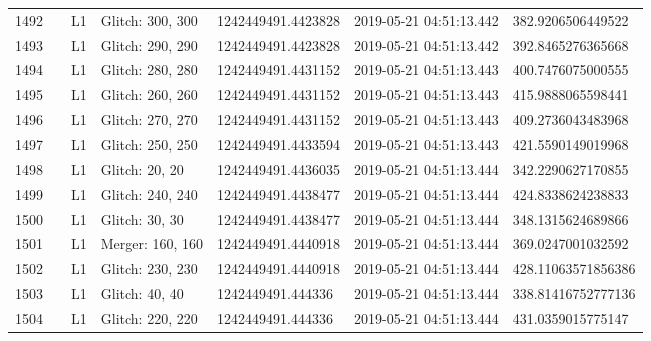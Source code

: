 \begin{longtable}{lllllll}
1492 &                                                    &       L1 &  Glitch: 300, 300 &  1242449491.4423828 &  2019-05-21 04:51:13.442 &   382.9206506449522 \\
1493 &                                                    &       L1 &  Glitch: 290, 290 &  1242449491.4423828 &  2019-05-21 04:51:13.442 &   392.8465276365668 \\
1494 &                                                    &       L1 &  Glitch: 280, 280 &  1242449491.4431152 &  2019-05-21 04:51:13.443 &   400.7476075000555 \\
1495 &                                                    &       L1 &  Glitch: 260, 260 &  1242449491.4431152 &  2019-05-21 04:51:13.443 &   415.9888065598441 \\
1496 &                                                    &       L1 &  Glitch: 270, 270 &  1242449491.4431152 &  2019-05-21 04:51:13.443 &   409.2736043483968 \\
1497 &                                                    &       L1 &  Glitch: 250, 250 &  1242449491.4433594 &  2019-05-21 04:51:13.443 &   421.5590149019968 \\
1498 &                                                    &       L1 &    Glitch: 20, 20 &  1242449491.4436035 &  2019-05-21 04:51:13.444 &   342.2290627170855 \\
1499 &                                                    &       L1 &  Glitch: 240, 240 &  1242449491.4438477 &  2019-05-21 04:51:13.444 &   424.8338624238833 \\
1500 &                                                    &       L1 &    Glitch: 30, 30 &  1242449491.4438477 &  2019-05-21 04:51:13.444 &   348.1315624689866 \\
1501 &                                                    &       L1 &  Merger: 160, 160 &  1242449491.4440918 &  2019-05-21 04:51:13.444 &   369.0247001032592 \\
1502 &                                                    &       L1 &  Glitch: 230, 230 &  1242449491.4440918 &  2019-05-21 04:51:13.444 &  428.11063571856386 \\
1503 &                                                    &       L1 &    Glitch: 40, 40 &   1242449491.444336 &  2019-05-21 04:51:13.444 &  338.81416752777136 \\
1504 &                                                    &       L1 &  Glitch: 220, 220 &   1242449491.444336 &  2019-05-21 04:51:13.444 &   431.0359015775147 \\

\end{longtable}
